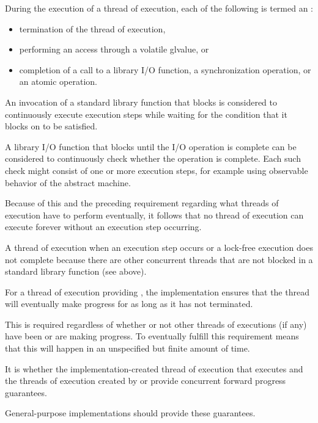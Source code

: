 \pnum
During the execution of a thread of execution, each of the following is termed
an :
\begin{itemize}
\item termination of the thread of execution,
\item performing an access through a volatile glvalue, or
\item completion of a call to a library I/O function, a
      synchronization operation, or an atomic operation.
\end{itemize}

\pnum
An invocation of a standard library function that blocks
is considered to continuously execute execution steps while waiting for the
condition that it blocks on to be satisfied.
\begin{example}
A library I/O function that blocks until the I/O operation is complete can
be considered to continuously check whether the operation is complete. Each
such check might consist of one or more execution steps, for example using
observable behavior of the abstract machine.
\end{example}

\pnum
\begin{note}
Because of this and the preceding requirement regarding what threads of execution
have to perform eventually, it follows that no thread of execution can execute
forever without an execution step occurring.
\end{note}

\pnum
A thread of execution 
when an execution step occurs or a
lock-free execution does not complete because there are other concurrent threads
that are not blocked in a standard library function (see above).

\pnum
{}%
For a thread of execution providing ,
the implementation ensures that the thread will eventually make progress for as
long as it has not terminated.
\begin{note}
This is required regardless of whether or not other threads of executions (if any)
have been or are making progress. To eventually fulfill this requirement means that
this will happen in an unspecified but finite amount of time.
\end{note}

\pnum
It is  whether the
implementation-created thread of execution that executes
 and the threads of execution created by
or 
provide concurrent forward progress guarantees.
\begin{note}
General-purpose implementations should provide these guarantees.
\end{note}

